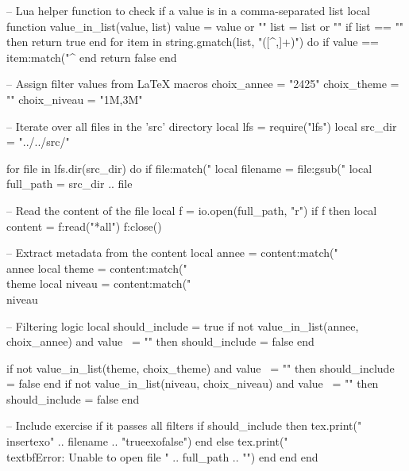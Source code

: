 \documentclass[a4paper,12pt]{report}
\def\choixAnnee{2425}
\def\choixTheme{}
\def\choixNiveau{1M,3M}
\edef\luaChoixAnnee{\choixAnnee}
\edef\luaChoixTheme{\choixTheme}
\edef\luaChoixNiveau{\choixNiveau}
\begin{document}
\begin{luacode}

-- Lua helper function to check if a value is in a comma-separated list
local function value_in_list(value, list)
    value = value or ""
    list = list or ""
    if list == "" then return true end
    for item in string.gmatch(list, "([^,]+)") do
        if value == item:match("^%
    end
    return false
end

-- Assign filter values from LaTeX macros
choix_annee = "\luaChoixAnnee"
choix_theme = "\luaChoixTheme"
choix_niveau = "\luaChoixNiveau"

-- Iterate over all files in the 'src' directory
local lfs = require("lfs")
local src_dir = "../../src/"

for file in lfs.dir(src_dir) do
    if file:match("%
        local filename = file:gsub("%
        local full_path = src_dir .. file
        
        -- Read the content of the file
        local f = io.open(full_path, "r")
        if f then
            local content = f:read("*all")
            f:close()
            
            -- Extract metadata from the content
            local annee = content:match("\\annee%
            local theme = content:match("\\theme%
            local niveau = content:match("\\niveau%
            
            -- Filtering logic
            local should_include = true
            if not value_in_list(annee, choix_annee) and value ~= "" then
                should_include = false
            end

            if not value_in_list(theme, choix_theme) and value ~= "" then
                should_include = false
            end
            if not value_in_list(niveau, choix_niveau) and value ~= "" then
                should_include = false
            end
            
            -- Include exercise if it passes all filters
            if should_include then
            	tex.print("\\insertexo{" .. filename .. "}{true}{exo}{false}")
            end
        else
            tex.print("\\textbf{Error: Unable to open file " .. full_path .. "}")
        end
    end
end
\end{luacode}
\end{document}
